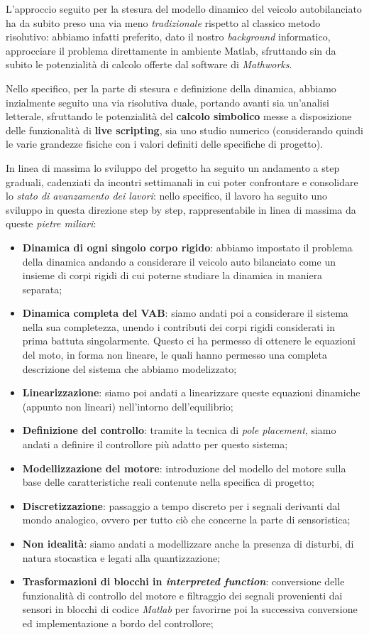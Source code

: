 L'approccio seguito per la stesura del modello dinamico del veicolo autobilanciato ha da subito preso una via meno \textit{tradizionale} rispetto al classico metodo risolutivo: abbiamo infatti preferito, dato il nostro \textit{background} informatico, approcciare il problema direttamente in ambiente Matlab, sfruttando sin da subito le potenzialità di calcolo offerte dal software di \textit{Mathworks}.

Nello specifico, per la parte di stesura e definizione della dinamica, abbiamo inzialmente seguito una via risolutiva duale, portando avanti sia un'analisi letterale, sfruttando le potenzialità del \textbf{calcolo simbolico} messe a disposizione delle funzionalità di \textbf{live scripting}, sia uno studio numerico (considerando quindi le varie grandezze fisiche con i valori definiti delle specifiche di progetto).

In linea di massima lo sviluppo del progetto ha seguito un andamento a step graduali, cadenziati da incontri settimanali in cui poter confrontare e consolidare lo \textit{stato di avanzamento dei lavori}: nello specifico, il lavoro ha seguito uno sviluppo in questa direzione step by step, rappresentabile in linea di massima da queste \textit{pietre miliari}:
\begin{itemize}
	\item \textbf{Dinamica di ogni singolo corpo rigido}: abbiamo impostato il problema della dinamica andando a considerare il veicolo auto bilanciato come un insieme di corpi rigidi di cui poterne studiare la dinamica in maniera separata;
	\item \textbf{Dinamica completa del VAB}: siamo andati poi a considerare il sistema nella sua completezza, unendo i contributi dei corpi rigidi considerati in prima battuta singolarmente.
	Questo ci ha permesso di ottenere le equazioni del moto, in forma non lineare, le quali hanno permesso una completa descrizione del sistema che abbiamo modelizzato;
	\item \textbf{Linearizzazione}: siamo poi andati a linearizzare queste equazioni dinamiche (appunto non lineari) nell'intorno dell'equilibrio;
	\item \textbf{Definizione del controllo}: tramite la tecnica di \textit{pole placement}, siamo andati a definire il controllore più adatto per questo sistema;
	\item \textbf{Modellizzazione del motore}: introduzione del modello del motore sulla base delle caratteristiche reali contenute nella specifica di progetto;
	\item \textbf{Discretizzazione}: passaggio a tempo discreto per i segnali derivanti dal mondo analogico, ovvero per tutto ciò che concerne la parte di sensoristica;
	\item \textbf{Non idealità}: siamo andati a modellizzare anche la presenza di disturbi, di natura stocastica e legati alla quantizzazione;
	\item \textbf{Trasformazioni di blocchi in \textit{interpreted function}}: conversione delle funzionalità di controllo del motore e filtraggio dei segnali provenienti dai sensori in blocchi di codice \textit{Matlab} per favorirne poi la successiva conversione ed implementazione a bordo del controllore;
\end{itemize}